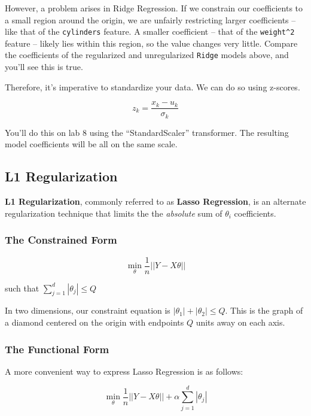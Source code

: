 \documentclass[
  letterpaper,
  DIV=11,
  numbers=noendperiod]{scrreprt}
\begin{document}
However, a problem arises in Ridge Regression. If we constrain our
coefficients to a small region around the origin, we are unfairly
restricting larger coefficients -- like that of the \texttt{cylinders}
feature. A smaller coefficient -- that of the \texttt{weight\^{}2}
feature -- likely lies within this region, so the value changes very
little. Compare the coefficients of the regularized and unregularized
\texttt{Ridge} models above, and you'll see this is true.

Therefore, it's imperative to standardize your data. We can do so using
z-scores.

\[z_k = \frac{x_k - u_k}{\sigma_k}\]

You'll do this on lab 8 using the ``StandardScaler'' transformer. The
resulting model coefficients will be all on the same scale.

\hypertarget{l1-regularization}{%
\subsection{L1 Regularization}\label{l1-regularization}}

\textbf{L1 Regularization}, commonly referred to as \textbf{Lasso
Regression}, is an alternate regularization technique that limits the
the \emph{absolute} sum of \(\theta_i\) coefficients.

\hypertarget{the-constrained-form-1}{%
\subsubsection{The Constrained Form}\label{the-constrained-form-1}}

\[\min_{\theta} \frac{1}{n} || Y - X\theta ||\]

such that \(\sum_{j=1}^{d} |\theta_j| \le Q\)

In two dimensions, our constraint equation is
\(|\theta_1| + |\theta_2| \le Q\). This is the graph of a diamond
centered on the origin with endpoints \(Q\) units away on each axis.

\hypertarget{the-functional-form-1}{%
\subsubsection{The Functional Form}\label{the-functional-form-1}}

A more convenient way to express Lasso Regression is as follows:

\[\min_{\theta} \frac{1}{n} || Y - X\theta || + \alpha \sum_{j=1}^{d} |\theta_j|\]
\end{document}
